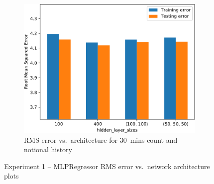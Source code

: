 \begin{figure}[!ht]
\begin{subfigure}[t]{.47\linewidth}
        \includegraphics[width=0.9\linewidth]{./figures/AplotA8.pdf}
        \caption{RMS error vs.~architecture for 30~mins count and notional history}\label{AppAplotA8}
    \end{subfigure}
    \caption{Experiment 1 -- MLPRegressor RMS error vs.~network architecture plots}\label{App:Exp1_plots1}
\end{figure}

